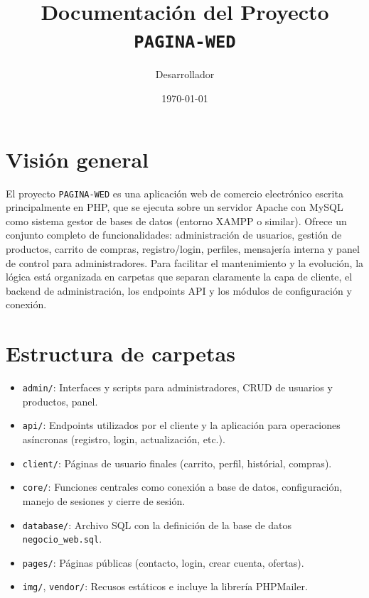 \documentclass[a4paper,12pt]{article}
\title{Documentaci\'on del Proyecto \texttt{PAGINA-WED}}
\author{Desarrollador}
\date{\today}
\begin{document}
\maketitle
\section{Visi\'on general}
El proyecto \texttt{PAGINA-WED} es una aplicaci\'on web de comercio electr\'onico escrita principalmente en PHP, que se ejecuta sobre un servidor Apache con MySQL como sistema gestor de bases de datos (entorno XAMPP o similar).
Ofrece un conjunto completo de funcionalidades: administraci\'on de usuarios, gesti\'on de productos, carrito de compras, registro/login, perfiles, mensajer\'ia interna y panel de control para administradores.
Para facilitar el mantenimiento y la evoluci\'on, la l\'ogica est\'a organizada en carpetas que separan claramente la capa de cliente, el backend de administraci\'on, los endpoints API y los m\'odulos de configuraci\'on y conexi\'on.

\section{Estructura de carpetas}
\begin{itemize}
  \item \texttt{admin/}: Interfaces y scripts para administradores, CRUD de usuarios y productos, panel.
  \item \texttt{api/}: Endpoints utilizados por el cliente y la aplicaci\'on para operaciones as\'incronas (registro, login, actualizaci\'on, etc.).
  \item \texttt{client/}: P\'aginas de usuario finales (carrito, perfil, hist\'orial, compras).
  \item \texttt{core/}: Funciones centrales como conexi\'on a base de datos, configuraci\'on, manejo de sesiones y cierre de sesi\'on.
  \item \texttt{database/}: Archivo SQL con la definici\'on de la base de datos \texttt{negocio\_web.sql}.
  \item \texttt{pages/}: P\'aginas p\'ublicas (contacto, login, crear cuenta, ofertas).
  \item \texttt{img/}, \texttt{vendor/}: Recusos est\'aticos e incluye la librer\'ia PHPMailer.
\end{itemize}
\end{document}
